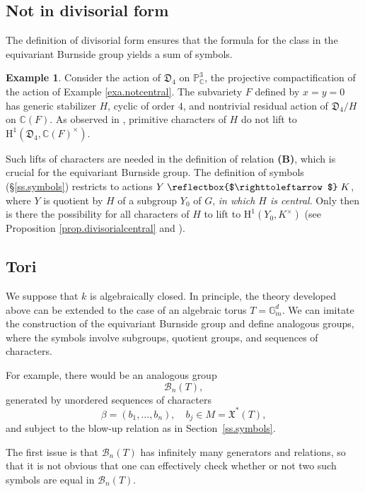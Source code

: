 \documentclass[12pt,reqno]{amsart}
\theoremstyle{plain}
\theoremstyle{remark}
\theoremstyle{definition}
\newtheorem{exam}[prop]{Example}
\numberwithin{equation}{section}
\newcommand{\C}{{\mathbb C}}
\newcommand{\bP}{{\mathbb P}}
\newcommand{\cB}{{\mathcal B}}
\newcommand{\rH}{{\mathrm H}}
\newcommand{\bG}{{\mathbb G}}
\newcommand{\actsfromleft}{\mathrel{\reflectbox{$\righttoleftarrow$}}}
\begin{document}
\subsection*{Not in divisorial form}
\label{ss.notdivisorial}
The definition of divisorial form ensures that the formula for the class in the equivariant Burnside group yields a sum of symbols.

\begin{exam}
\label{exa.D8action}
Consider the action of $\mathfrak{D}_4$ on $\bP^3_{\C}$, the projective compactification of the action of Example \ref{exa.notcentral}.
The subvariety $F$ defined by $x=y=0$ has generic stabilizer $H$, cyclic of order $4$, and nontrivial residual action of $\mathfrak{D}_4/H$ on $\C(F)$.
As observed in \cite[Exa.\ 3.5]{BnG}, primitive characters of $H$ do not lift to $\rH^1(\mathfrak{D}_4,\C(F)^\times)$.
\end{exam}

Such lifts of characters are needed in the definition of relation \textbf{(B)}, which is crucial for the equivariant Burnside group.
The definition of symbols (\S \ref{ss.symbols}) restricts to actions $Y\actsfromleft K$, where $Y$ is quotient by $H$ of a subgroup $Y_0$ of $G$, \emph{in which $H$ is central}.
Only then is there the possibility for all characters of $H$ to lift to $\rH^1(Y_0,K^\times)$
(see Proposition \ref{prop.divisorialcentral} and \cite[Lemma 2.1]{KT-struct}).



\subsection*{Tori}
\label{ss.tori}
We suppose that $k$ is algebraically closed.
In principle, the theory developed above can be extended to the case of an algebraic torus $T=\bG_m^d$. 
We can imitate the construction of the equivariant Burnside group and define analogous groups, where the symbols involve subgroups, quotient groups, and sequences of characters. 

For example, there would be an analogous group 
$$
\cB_n(T),
$$
generated by unordered sequences of characters 
$$
\beta = (b_1,\ldots, b_n), \quad b_j \in M = \mathfrak X^*(T),
$$
and subject to the blow-up relation as in Section~\ref{ss.symbols}. 

The first issue is that 
$\cB_n(T)$ has infinitely many generators and relations, so that it is not obvious that one can effectively check whether or not two such symbols are equal in $\cB_n(T)$. 
\end{document}
